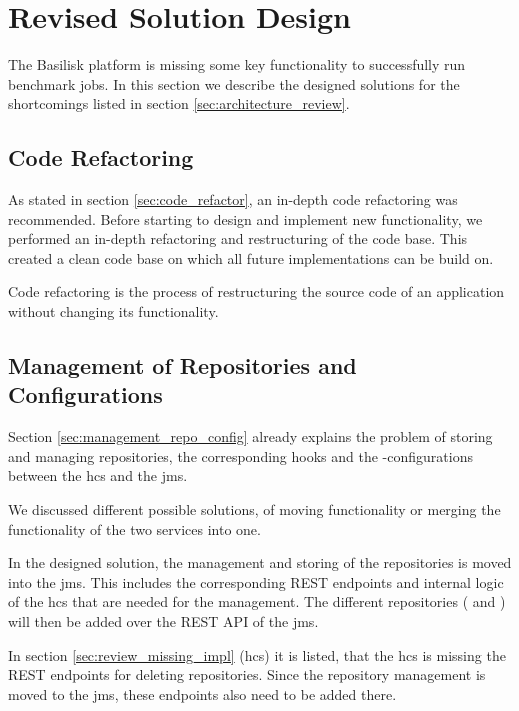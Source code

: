 \section{Revised Solution Design}
\label{sec:revised_solution_design}

The Basilisk platform is missing some key functionality to successfully run benchmark jobs.
In this section we describe the designed solutions for the shortcomings listed in section \ref{sec:architecture_review}.



\subsection{Code Refactoring}
\label{sec:impl_code_refactor}
As stated in section \ref{sec:code_refactor}, an in-depth code refactoring was recommended.
Before starting to design and implement new functionality, we performed an in-depth refactoring and restructuring of the code base.
This created a clean code base on which all future implementations can be build on.

Code refactoring is the process of restructuring the source code of an application without changing its functionality\cite{fowlerRefactoringImprovingDesign2019a}.


\subsection{Management of Repositories and Configurations}
\label{sec:management_repo_config_design}
Section \ref{sec:management_repo_config} already explains the problem of storing and managing repositories, the corresponding hooks and the \ts{}-configurations between the \acf{hcs} and the \acf{jms}.

We discussed different possible solutions, of moving functionality or merging the functionality of the two services into one.

In the designed solution, the management and storing of the repositories is moved into the \ac{jms}.
This includes the corresponding REST endpoints and internal logic of the \ac{hcs} that are needed for the management.
The different repositories (\gh{} and \dockh{}) will then be added over the REST API of the \ac{jms}.

In section \ref{sec:review_missing_impl} (\acl{hcs}) it is listed, that the \ac{hcs} is missing the REST endpoints for deleting repositories.
Since the repository management is moved to the \ac{jms}, these endpoints also need to be added there.
\\

